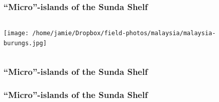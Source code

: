 \begin{frame}
    \frametitle{``Micro''-islands of the Sunda Shelf}
    \vspace{-2mm}
    \begin{columns}
        \column{\dimexpr\paperwidth}
        \texttt{[image: /home/jamie/Dropbox/field-photos/malaysia/malaysia-burungs.jpg]}
    \end{columns}
\end{frame}

{
\begin{frame}
    \frametitle{``Micro''-islands of the Sunda Shelf}
\end{frame}
}

{
\begin{frame}
    \frametitle{``Micro''-islands of the Sunda Shelf}
\end{frame}
}

